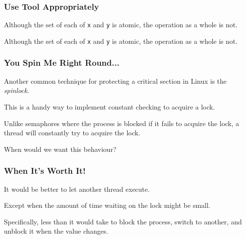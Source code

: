 \begin{frame}
\frametitle{Use Tool Appropriately}

Although the set of each of \texttt{x} and \texttt{y} is atomic, the operation as a whole is not.

Although the set of each of \texttt{x} and \texttt{y} is atomic, the operation as a whole is not.

\end{frame}


\begin{frame}
\frametitle{You Spin Me Right Round...}

Another common technique for protecting a critical section in Linux is the \textit{spinlock}.

This is a handy way to implement constant checking to acquire a lock. 

Unlike semaphores where the process is blocked if it fails to acquire the lock, a thread will constantly try to acquire the lock. 

When would we want this behaviour?

\end{frame}


\begin{frame}
\frametitle{When It's Worth It!}

It would be better to let another thread execute.

Except when the amount of time waiting on the lock might be small.

Specifically, less than it would take to block the process, switch to another, and unblock it when the value changes.


\end{frame}

